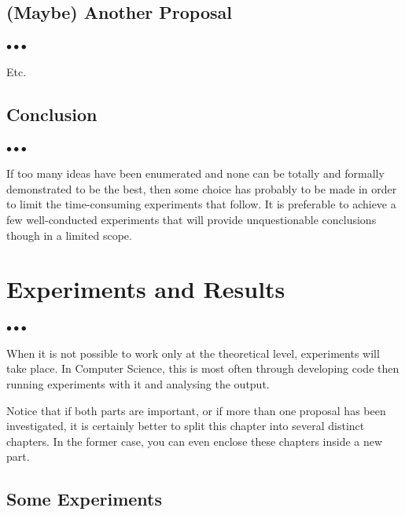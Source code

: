 \documentclass[11pt, english, screen, research-development]{report-rd-info}
\newenvironment{explanation}
{\color{blue}
 \begin{list}{}{\hspace{0.2\textwidth}\color{blue}}\item $\bullet\bullet\bullet$
}
{\end{list}}
\begin{document}
\section{(Maybe) Another Proposal}

\begin{explanation}
   Etc.
\end{explanation}

\section{Conclusion}

\begin{explanation}
   If too many ideas have been enumerated and none can be totally and formally demonstrated to be the best, then some choice has probably to be made in order to limit the time-consuming experiments that follow.
   It is preferable to achieve a few well-conducted experiments that will provide unquestionable conclusions though in a limited scope.
\end{explanation}



\chapter{Experiments and Results}
\label{chap:Experiments}

\begin{explanation}
   When it is not possible to work only at the theoretical level, experiments will take place.
   In Computer Science, this is most often through developing code then running experiments with it and analysing the output.

   Notice that if both parts are important, or if more than one proposal has been investigated, it is certainly better to split this chapter into several distinct chapters.
   In the former case, you can even enclose these chapters inside a new part.
\end{explanation}

\section{Some Experiments}
\end{document}
